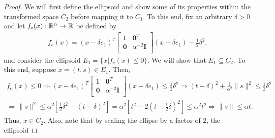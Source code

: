 \begin{proof}
We will first define the ellipsoid and show some of its properties within the transformed space $C_2$ before mapping it to $C_1$.
To this end, fix an arbitrary $\delta > 0$ and let 
$f_{e}(x): \mathbb R^n \to \mathbb R $ be defined by 
\begin{align*}
f_{e}(x) = (x - \delta e_1)^T\begin{bmatrix}
1 & \boldsymbol0^T \\
\boldsymbol 0 & \alpha^{-2} \boldsymbol I \\
\end{bmatrix}(x - \delta e_1) - \frac 1 2 \delta^2,
\end{align*} 
and consider the ellipsoid $E_1 = \{x | f_{e}(x) \le 0\}$.
We will show that $E_1 \subseteq C_2$.
To this end, suppose $x = (t, s) \in E_1$.
Then,
\begin{align*}
f_e(x) \le 0 \Longrightarrow 
(x - \delta e_1)^T\begin{bmatrix}
1 & \boldsymbol0^T \\
\boldsymbol 0 & \alpha^{-2} \boldsymbol I \\
\end{bmatrix}(x - \delta e_1) \le \frac 1 2 \delta^2 
\Longrightarrow (t - \delta)^2 + \frac {1} {\alpha^2} \|s\|^2 \le \frac 1 2 \delta^2 \\
\Longrightarrow \|s\|^2 \le \alpha^2 \left[\frac 1 2 \delta^2 - (t - \delta)^2\right] 
= \alpha^2 \left[t^2 - 2(t - \frac 1 2 \delta)^2 \right] \le \alpha^2t^2
\Longrightarrow \|s\| \le \alpha t.
\end{align*}
Thus, $x \in C_2$.
Also, note that by scaling the ellipse by a factor of $2$, the ellipsoid


\end{proof}
